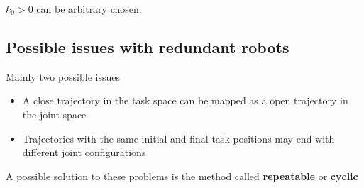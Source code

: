 $k_0 > 0$ can be arbitrary chosen. 

\subsection{Possible issues with redundant robots}

Mainly two possible issues

\begin{itemize}
\item A close trajectory in the task space can be mapped as a open trajectory in the joint space
\item Trajectories with the same initial and final task positions may end with different joint configurations
\end{itemize}

A possible solution to these problems is the method called \textbf{repeatable} or \textbf{cyclic}



